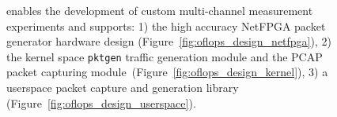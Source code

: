 \begin{figure}
\centering
{}
\label{fig:oflops_design}
\caption[\oflops architecture]{\oflops enables the development of
  custom multi-channel measurement experiments and supports: 1) the high accuracy
  NetFPGA packet generator hardware design
  (Figure~\ref{fig:oflops_design_netfpga}), 2) the kernel space {\tt pktgen}
  traffic generation module and the PCAP packet capturing
  module~(Figure~\ref{fig:oflops_design_kernel}), 3) a userspace packet capture
  and generation library (Figure~\ref{fig:oflops_design_userspace}).}
\end{figure}

